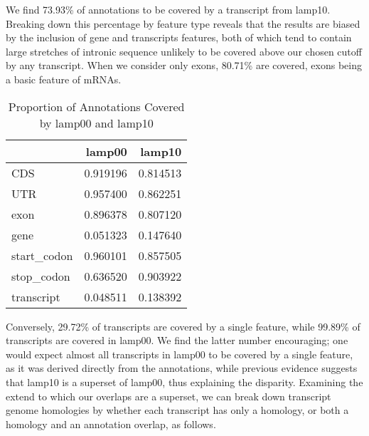 \documentclass{article}
\begin{document}



We find 73.93\%
 of annotations to be covered by a transcript from lamp10. 
Breaking down this percentage by feature type reveals that the results are biased by the inclusion of gene and transcripts features, 
both of which tend to contain large stretches of intronic sequence unlikely to be covered above our chosen cutoff by any transcript. 
When we consider only exons, 80.71\%
 are covered, exons
being a basic feature of mRNAs.

\begin{table}[H]
\caption {Proportion of Annotations Covered by lamp00 and lamp10}
\begin{center}

\begin{tabular}{lrr}
\toprule
{} &    lamp00 &    lamp10 \\
\midrule
CDS         &  0.919196 &  0.814513 \\
UTR         &  0.957400 &  0.862251 \\
exon        &  0.896378 &  0.807120 \\
gene        &  0.051323 &  0.147640 \\
start\_codon &  0.960101 &  0.857505 \\
stop\_codon  &  0.636520 &  0.903922 \\
transcript  &  0.048511 &  0.138392 \\
\bottomrule
\end{tabular}



\end{center}
\end{table}

Conversely, 29.72\%
 of transcripts are covered by a single feature, while 99.89\%
 of 
transcripts are covered in lamp00. We find the latter number encouraging; one would expect almost all transcripts in lamp00 to be covered by a single feature, as it was derived directly from the annotations,
while previous evidence suggests that lamp10 is a superset of lamp00, thus explaining the disparity. Examining the extend to which our overlaps are a superset, we can break down transcript genome homologies by
whether each transcript has only a homology, or both a homology and an annotation overlap, as follows.
\end{document}
